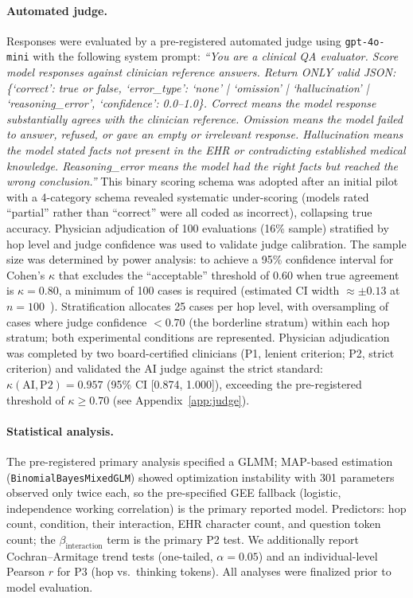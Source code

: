 \documentclass{article}
\begin{document}
\paragraph{Automated judge.}
\label{sec:judge}
Responses were evaluated by a pre-registered automated judge using
\texttt{gpt-4o-mini} with the following system prompt:
\textit{``You are a clinical QA evaluator. Score model responses against
clinician reference answers. Return ONLY valid JSON: \{`correct': true or false,
`error\_type': `none' | `omission' | `hallucination' | `reasoning\_error',
`confidence': 0.0--1.0\}. Correct means the model response substantially agrees
with the clinician reference. Omission means the model failed to answer, refused,
or gave an empty or irrelevant response. Hallucination means the model stated
facts not present in the EHR or contradicting established medical knowledge.
Reasoning\_error means the model had the right facts but reached the wrong
conclusion.''}
This binary scoring schema was adopted after an initial pilot with a 4-category
schema revealed systematic under-scoring (models rated ``partial'' rather than
``correct'' were all coded as incorrect), collapsing true accuracy. Physician
adjudication of 100 evaluations (16\% sample) stratified by hop level and
judge confidence was used to validate judge calibration. The sample size
was determined by power analysis: to achieve a 95\% confidence interval for
Cohen's $\kappa$ that excludes the ``acceptable'' threshold of 0.60 when
true agreement is $\kappa = 0.80$, a minimum of 100 cases is required
(estimated CI width $\approx \pm 0.13$ at $n=100$~\citep{donner1992testing}).
Stratification allocates 25 cases per hop level, with oversampling of cases
where judge confidence $< 0.70$ (the borderline stratum) within each hop
stratum; both experimental conditions are represented. Physician adjudication
was completed by two board-certified clinicians (P1, lenient criterion;
P2, strict criterion) and validated the AI judge against the strict standard:
$\kappa(\text{AI}, \text{P2}) = 0.957$ (95\% CI [0.874, 1.000]), exceeding
the pre-registered threshold of $\kappa \geq 0.70$ (see Appendix~\ref{app:judge}).

\paragraph{Statistical analysis.}
The pre-registered primary analysis specified a GLMM; MAP-based estimation
(\texttt{BinomialBayesMixedGLM}) showed optimization instability with 301
parameters observed only twice each, so the pre-specified GEE fallback
(logistic, independence working correlation) is the primary reported model.
Predictors: hop count, condition, their interaction, EHR character count, and
question token count; the $\beta_\text{interaction}$ term is the primary P2 test.
We additionally report Cochran--Armitage trend tests (one-tailed, $\alpha = 0.05$)
and an individual-level Pearson $r$ for P3 (hop vs.\ thinking tokens).
All analyses were finalized prior to model evaluation.
\end{document}
